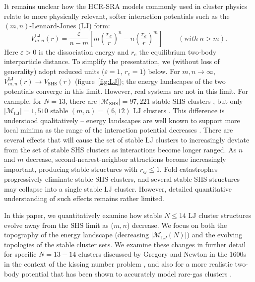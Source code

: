 It remains unclear how the HCR-SRA models commonly
used in cluster physics relate to more physically relevant, softer interaction potentials such
as the $(m,n)$-Lennard-Jones (LJ) form:
\begin{equation}
V_{m,n}^\mathrm{LJ}(r)=\frac{\varepsilon}{n-m}\left[m\left(\frac{r_e}{r}\right)^{n}-n\left(\frac{r_e}{r}\right)^{m}\right] \ \ \ \ \ \ \ \ \ \  ({\mathrm with}\ n > m).
\label{eqn:nmpot}
\end{equation}
Here $\varepsilon>0$ is the dissociation energy and $r_e$ the equilibrium
two-body interparticle distance. To simplify the presentation,
we (without loss of generality) adopt reduced units ($\varepsilon=1$, $r_e=1$) below.
For $m,n\rightarrow \infty$,
$V_{m,n}^\mathrm{LJ}(r) \rightarrow V_\mathrm{SHS}(r)$ (figure~\ref{fig:LJ}); the
energy landscapes of the two potentials converge in this limit.  However, real
systems are not in this limit.  For example, for $N = 13$, there are $|\mathcal{M}_\mathrm{SHS}|=97,221$
stable \ac{SHS} clusters \autocite{Hoy_Structuredynamicsmodel_2015,Holmes-Cerfon_EnumeratingRigidSphere_2016},
but only $|\mathcal{M}_\mathrm{LJ}|=1,510$ stable $(m,n) = (6,12)$ LJ clusters \autocite{Doye_Evolutionpotentialenergy_1999}.  
This difference is understood qualitatively -- energy landscapes are well known to support more
local minima
as the range of the interaction potential decreases \autocite{braier90,Wales_MicroscopicBasisGlobal_2001}.
There are several effects that will cause the set of
stable LJ clusters to increasingly deviate from the set of stable \ac{SHS} clusters
as interactions become longer ranged.  As $n$ and $m$ decrease,
second-nearest-neighbor attractions become increasingly important,
producing stable structures with $r_{ij} \leq 1$.  Fold catastrophes
\autocite{Wales_MicroscopicBasisGlobal_2001,Wales_Energylandscapes_2003} progressively eliminate stable \ac{SHS} clusters, and several stable \ac{SHS}
structures may collapse into a single stable LJ cluster.  However,
detailed quantitative understanding of such effects remains rather limited.

In this paper, we quantitatively examine how stable $N \leq 14$ LJ cluster
structures evolve away from the \ac{SHS} limit as ($m, n$) decrease.  We focus on
both the topography of the energy landscape (decreasing
$|\mathcal{M}_{\mathrm LJ}(N)|$) and the evolving topologies of the stable cluster sets.
We examine these changes in further detail for specific $N = 13-14$ clusters discussed by
Gregory and Newton in the 1600s in the context of the kissing number problem
\autocite{Schutte_ProblemdreizehnKugeln_1952}, and also for a more realistic two-body potential that has
been shown to accurately model rare-gas clusters \autocite{Schwerdtfeger_ExtensionLennardJonespotential_2006}.





